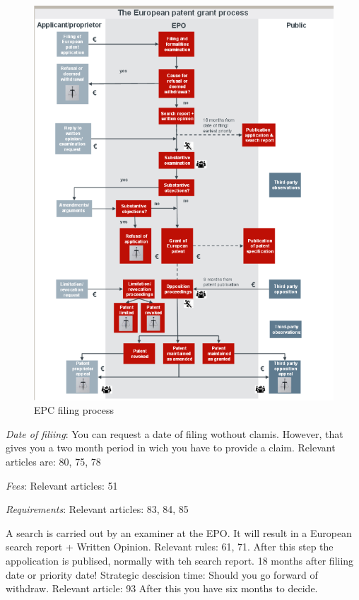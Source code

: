 \documentclass[12pt]{article} %
\begin{document}
\begin{figure}[]
    \centering
    \includegraphics[]{EPC_process.png}
    \caption{EPC filing process}
    \label{fig:EPC_process}
\end{figure}


\textit{Date of filiing}: You can request a date of filing wothout clamis.
However, that gives you a two month period in wich you have to provide a claim.
Relevant articles are: 80, 75, 78

\par \textit{Fees}: Relevant articles: 51

\par \textit{Requirements}: Relevant articles: 83, 84, 85

\par A search is carried out by an examiner at the EPO. It will result in a European search report + Written Opinion.
Relevant rules: 61, 71.
After this step the appolication is publised, normally with teh search report. 18 months after filiing date or priority date!
Strategic descision time: Should you go forward of withdraw.
Relevant article: 93
After this you have six months to decide.
\end{document}

